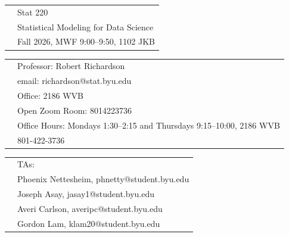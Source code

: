 \documentclass[11pt]{article}
\begin{document}
\begin{tabular}{ l l }
  \multirow{3}{*}{} & \LARGE Stat 220 \\
  & \LARGE Statistical Modeling for Data Science \\
  & \LARGE Fall 2026, MWF 9:00--9:50, 1102 JKB \\
\end{tabular}
\vspace{8mm}

\begin{tabular}{ l l }
  \multirow{6}{*}{} & \large Professor: Robert Richardson \\
  & \hspace{5mm} \large email: richardson@stat.byu.edu \\
  & \hspace{5mm} \large Office: 2186 WVB \\
  & \hspace{5mm} \large Open Zoom Room: 8014223736 \\
  & \hspace{5mm} \large Office Hours: Mondays 1:30--2:15 and Thursdays 9:15--10:00, 2186 WVB \\
  & \hspace{5mm} \large 801-422-3736 \\
\end{tabular}
\vspace{5mm}

\begin{tabular}{ l l }
  \multirow{6}{*}{} & \large TAs: \\
  & \hspace{5mm} \large Phoenix Nettesheim, phnetty@student.byu.edu \\
  & \hspace{5mm} \large Joseph Asay, jasay1@student.byu.edu \\
  & \hspace{5mm} \large Averi Carlson, averipc@student.byu.edu \\
  & \hspace{5mm} \large Gordon Lam, klam20@student.byu.edu \\
\end{tabular}
\vspace{3mm}
\end{document}

